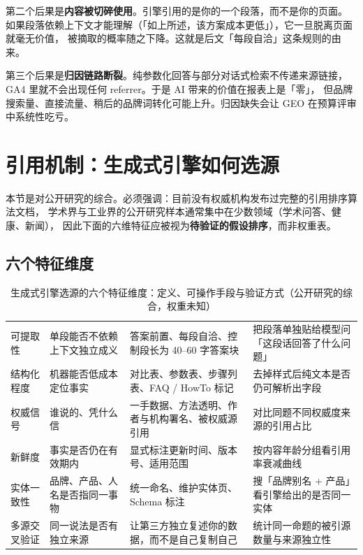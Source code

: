 第二个后果是\textbf{内容被切碎使用}。引擎引用的是你的一个段落，而不是你的页面。
如果段落依赖上下文才能理解（「如上所述，该方案成本更低」），它一旦脱离页面就毫无价值，
被摘取的概率随之下降。这就是后文「每段自洽」这条规则的由来。

第三个后果是\textbf{归因链路断裂}。纯参数化回答与部分对话式检索不传递来源链接，
GA4 里就不会出现任何 referrer。于是 AI 带来的价值在报表上是「零」，
但品牌搜索量、直接流量、稍后的品牌词转化可能上升。归因缺失会让 GEO 在预算评审中系统性吃亏。

\section{引用机制：生成式引擎如何选源}
\label{sec:geo-citation}

本节是对公开研究的综合。必须强调：目前没有权威机构发布过完整的引用排序算法文档，
学术界与工业界的公开研究样本通常集中在少数领域（学术问答、健康、新闻），
因此下面的六维特征应被视为\textbf{待验证的假设排序}，而非权重表。

\subsection{六个特征维度}

\begin{table}[htbp]
\centering
\caption{生成式引擎选源的六个特征维度：定义、可操作手段与验证方式（公开研究的综合，权重未知）}
\label{tab:citation-features}
\small
\begin{tabularx}{\textwidth}{L{1.9cm} L{3.2cm} L{3.5cm} Y}
\toprule
{} &  &  &  \\
\midrule
可提取性 & 单段能否不依赖上下文独立成义 &
答案前置、每段自洽、控制段长为 40--60 字答案块 & 把段落单独贴给模型问「这段话回答了什么问题」 \\
结构化程度 & 机器能否低成本定位事实 &
对比表、参数表、步骤列表、FAQ / HowTo 标记 & 去掉样式后纯文本是否仍可解析出字段 \\
权威信号 & 谁说的、凭什么信 &
一手数据、方法透明、作者与机构署名、被权威源引用 & 对比同题不同权威度来源的引用占比 \\
新鲜度 & 事实是否仍在有效期内 &
显式标注更新时间、版本号、适用范围 & 按内容年龄分组看引用率衰减曲线 \\
实体一致性 & 品牌、产品、人名是否指同一事物 &
统一命名、维护实体页、Schema 标注  & 搜「品牌别名 + 产品」看引擎给出的是否同一实体 \\
多源交叉验证 & 同一说法是否有独立来源 &
让第三方独立复述你的数据，而不是自己复制自己 & 统计同一命题的被引源数量与来源独立性 \\
\bottomrule
\end{tabularx}
\end{table}

